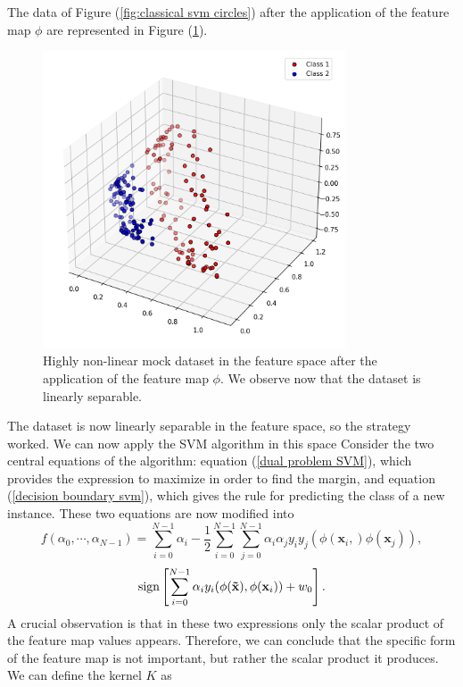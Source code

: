 \documentclass[12pt]{article}
\begin{document}
The data of Figure (\ref{fig:classical svm circles}) after the application of the feature map $\phi$ are represented in Figure (\ref{fig:classical svm circle 3d}). 
\begin{figure}[h!]
    \centering
    \includegraphics[width=0.8\textwidth]{images/circles3d.png}
    \caption{Highly non-linear mock dataset in the feature space after the application of the feature map $\phi$. We observe now that the dataset is linearly separable.}
    \label{fig:classical svm circle 3d}
\end{figure}
The dataset is now linearly separable in the feature space, so the strategy worked. We can now apply the SVM algorithm in this space Consider the two central equations of the algorithm: equation (\ref{dual problem SVM}), which provides the expression to maximize in order to find the margin, and equation (\ref{decision boundary svm}), which gives the rule for predicting the class of a new instance. These two equations are now modified into 
\begin{equation}
    f(\alpha_0,\cdots,\alpha_{N-1})=\sum_{i=0}^{N-1} \alpha_i-\frac{1}{2}\sum_{i=0}^{N-1}\sum_{j=0}^{N-1}\alpha_i\alpha_jy_iy_j(\phi(\mathbf{x}_i,)\phi(\mathbf{x}_j)),
    \label{kernel max}
\end{equation}
\begin{equation}
    \textup{sign}\left[\sum_{i=0}^{N-1}\alpha_iy_i(\phi(\mathbf{\tilde{x}}), \phi(\mathbf{x}_i))+w_0\right].
    \label{kernel prodiction}
\end{equation}
A crucial observation is that in these two expressions only the scalar product of the feature map values appears. Therefore, we can conclude that the specific form of the feature map is not important, but rather the scalar product it produces. We can define the kernel $K$ as 
\end{document}
